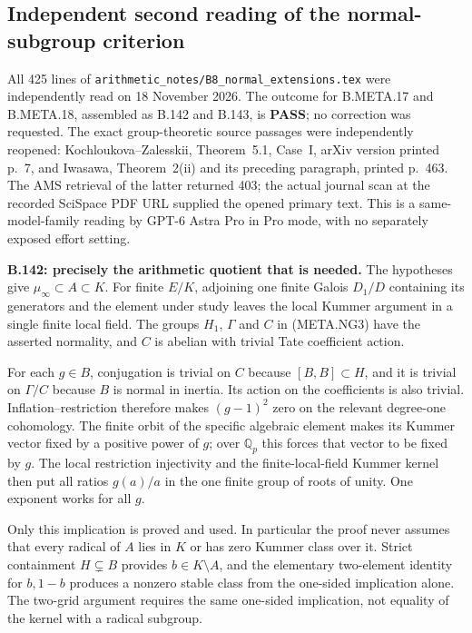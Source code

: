 \subsection*{Independent second reading of the normal-subgroup criterion}

All 425 lines of
\texttt{arithmetic\_notes/B8\_normal\_extensions.tex}
were independently read on 18 November 2026.
The outcome for B.META.17 and B.META.18, assembled as
B.142 and B.143, is \textbf{PASS}; no correction was
requested.  The exact group-theoretic source passages
were independently reopened: Kochloukova--Zalesskii,
Theorem~5.1, Case~I, arXiv version printed p.~7, and
Iwasawa, Theorem~2(ii) and its preceding paragraph,
printed p.~463.  The AMS retrieval of the latter
returned 403; the actual journal scan at the recorded
SciSpace PDF URL supplied the opened primary text.
This is a same-model-family reading by GPT-6 Astra Pro
in Pro mode, with no separately exposed effort setting.

\medskip\noindent\textbf{B.142: precisely the arithmetic quotient that is needed.}
The hypotheses give $\mu_\infty\subset A\subset K$.
For finite $E/K$, adjoining one finite Galois $D_1/D$
containing its generators and the element under study
leaves the local Kummer argument in a single finite
local field.  The groups $H_1$, $\Gamma$ and $C$ in
(META.NG3) have the asserted normality, and $C$ is
abelian with trivial Tate coefficient action.

For each $g\in B$, conjugation is trivial on $C$
because $[B,B]\subset H$, and it is trivial on
$\Gamma/C$ because $B$ is normal in inertia.
Its action on the coefficients is also trivial.
Inflation--restriction therefore makes $(g-1)^2$
zero on the relevant degree-one cohomology.  The
finite orbit of the specific algebraic element makes
its Kummer vector fixed by a positive power of $g$;
over $\mathbb Q_p$ this forces that vector to be
fixed by $g$.  The local restriction injectivity
and the finite-local-field Kummer kernel then put
all ratios $g(a)/a$ in the one finite group of
roots of unity.  One exponent works for all $g$.

Only this implication is proved and used.  In
particular the proof never assumes that every
radical of $A$ lies in $K$ or has zero Kummer
class over it.  Strict containment $H\subsetneq B$
provides $b\in K\setminus A$, and the elementary
two-element identity for $b,1-b$ produces a
nonzero stable class from the one-sided implication
alone.  The two-grid argument requires the same
one-sided implication, not equality of the kernel
with a radical subgroup.


